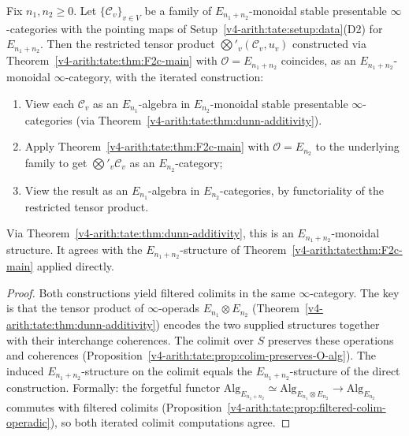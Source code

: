 \begin{proposition}
\label{v4-arith:tate:prop:dunn-compat}
\ClaimStatusProvedHere Fix \(n_{1},n_{2}\geq 0\). Let
\(\{\mathcal{C}_{v}\}_{v\in V}\) be a family of
\(E_{n_{1}+n_{2}}\)-monoidal stable presentable \(\infty\)-categories
with the pointing maps of Setup~\ref{v4-arith:tate:setup:data}(D2)
for \(E_{n_1+n_2}\). Then the
restricted tensor product
\(\bigotimes'_{v}(\mathcal{C}_{v},u_{v})\) constructed via
Theorem~\ref{v4-arith:tate:thm:F2c-main} with
\(\mathcal{O}=E_{n_{1}+n_{2}}\) coincides, as an
\(E_{n_{1}+n_{2}}\)-monoidal \(\infty\)-category, with the iterated
construction:
\begin{enumerate}
\item[(a)] View each \(\mathcal{C}_{v}\) as an \(E_{n_{1}}\)-algebra in
\(E_{n_{2}}\)-monoidal stable presentable \(\infty\)-categories (via
Theorem~\ref{v4-arith:tate:thm:dunn-additivity}).
\item[(b)] Apply Theorem~\ref{v4-arith:tate:thm:F2c-main} with
\(\mathcal{O}=E_{n_{2}}\) to the underlying family to get
\(\bigotimes'_{v}\mathcal{C}_{v}\) as an \(E_{n_{2}}\)-category;
\item[(c)] View the result as an \(E_{n_{1}}\)-algebra in
\(E_{n_{2}}\)-categories, by functoriality of the restricted tensor
product.
\end{enumerate}
Via Theorem~\ref{v4-arith:tate:thm:dunn-additivity}, this is an
\(E_{n_{1}+n_{2}}\)-monoidal structure. It agrees with the
\(E_{n_{1}+n_{2}}\)-structure of
Theorem~\ref{v4-arith:tate:thm:F2c-main} applied directly.
\end{proposition}

\begin{proof}
Both constructions yield filtered colimits in the same
\(\infty\)-category. The key is that the tensor product
of \(\infty\)-operads \(E_{n_{1}}\otimes E_{n_{2}}\)
(Theorem~\ref{v4-arith:tate:thm:dunn-additivity}) encodes the two supplied
structures together with their interchange coherences. The
colimit over \(S\) preserves these operations and coherences
(Proposition~\ref{v4-arith:tate:prop:colim-preserves-O-alg}). The
induced \(E_{n_{1}+n_{2}}\)-structure on the colimit equals the
\(E_{n_{1}+n_{2}}\)-structure of the direct construction.
Formally: the forgetful functor
\(\mathrm{Alg}_{E_{n_{1}+n_{2}}}\simeq\mathrm{Alg}_{E_{n_{1}}\otimes E_{n_{2}}}\to\mathrm{Alg}_{E_{n_{2}}}\)
commutes with filtered colimits
(Proposition~\ref{v4-arith:tate:prop:filtered-colim-operadic}), so both
iterated colimit computations agree.
\end{proof}

